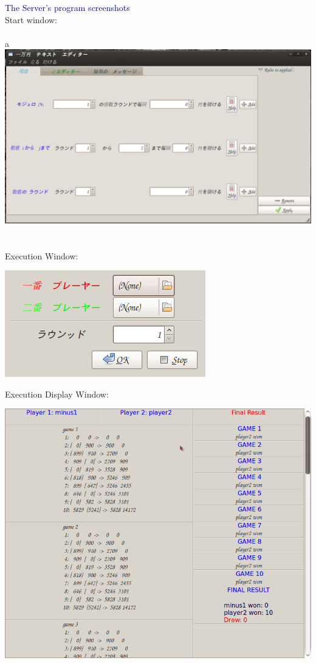 \documentclass[11pt]{sample}
\begin{document}
\newpage
\textcolor{Navy}{The Server's program screenshots}\\
Start window:\\\\a
\hspace{-28mm}\includegraphics[height=25\baselineskip]{img/IDE.png}
\\\\\\
Execution Window:
\begin{center}\includegraphics[height=10\baselineskip]{img/executing.png}\end{center}
\newpage
Execution Display Window:
\begin{center}\includegraphics[height=28\baselineskip]{img/Display-program.png}\end{center}
\end{document}

